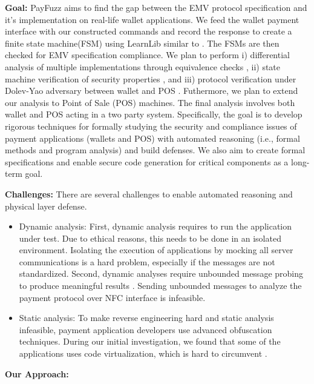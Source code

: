 \textbf{Goal: }PayFuzz aims to find the gap between the EMV protocol specification and it's implementation on real-life wallet 
applications. We feed the wallet payment interface with our constructed commands and record the response to 
create a finite state machine(FSM) using LearnLib similar to \cite{formalmodels}. The FSMs are then checked for EMV specification 
compliance. We plan to perform i) differential analysis of multiple implementations through equivalence 
checks \cite{7491755}, ii) state machine verification of security properties \cite{Hussain2018LTEInspectorAS}, 
and iii) protocol verification under Dolev-Yao adversary \cite{securityofpublickey} 
between wallet and POS \cite{10.1007/978-3-642-39799-8_48}. Futhermore, we plan to extend our analysis to Point of 
Sale (POS) machines. The final analysis involves both wallet and POS acting in a two party system. 
Specifically, the goal is to develop rigorous techniques for formally studying the security and 
compliance issues of payment applications (wallets and POS) with automated reasoning (i.e., formal methods and program analysis) and build defenses. We also 
aim to create formal specifications and enable secure code generation for critical components as a long-term goal.

\textbf{Challenges: }There are several challenges to enable automated reasoning and physical layer defense.
\begin{itemize}
    \item Dynamic analysis: First, dynamic analysis requires to run the application under test. Due
    to ethical reasons, this needs to be done in an isolated environment. Isolating the execution of applications
    by mocking all server communications is a hard problem, especially if the messages are not standardized.
    Second, dynamic analyses require unbounded message probing to produce meaningful results \cite{dtlsimplement}. Sending
    unbounded messages to analyze the payment protocol over NFC interface is infeasible.
    \item Static analysis: To make reverse engineering hard and static analysis infeasible, payment
    application developers use advanced obfuscation techniques. During our initial investigation, we found that
    some of the applications uses code virtualization, which is hard to circumvent \cite{vmhunt}.

\end{itemize}

\textbf{Our Approach: }